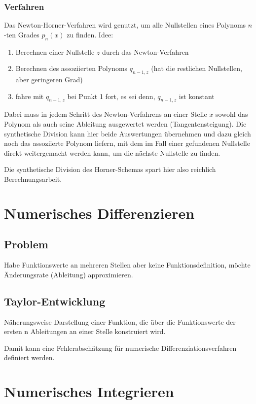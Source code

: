 \documentclass[a4paper, 12pt]{article}
\begin{document}
\subsubsection*{Verfahren}
Das Newton-Horner-Verfahren wird genutzt, um alle Nullstellen eines Polynoms \(n\)-ten Grades \(p_n(x)\) zu finden. Idee:
\begin{enumerate}
  \item Berechnen einer Nullstelle \(z\) durch das Newton-Verfahren
  \item Berechnen des assoziierten Polynoms \(q_{n-1,z}\) (hat die restlichen Nullstellen, aber geringeren Grad)
  \item fahre mit \(q_{n-1,z}\) bei Punkt 1 fort, es sei denn, \(q_{n-1,z}\) ist konstant
\end{enumerate}
Dabei muss in jedem Schritt des Newton-Verfahrens an einer Stelle \(x\) sowohl das Polynom als auch seine Ableitung ausgewertet werden (Tangentensteigung). Die synthetische Division kann hier beide Auswertungen übernehmen und dazu gleich noch das assoziierte Polynom liefern, mit dem im Fall einer gefundenen Nullstelle direkt weitergemacht werden kann, um die nächste Nullstelle zu finden.

Die synthetische Division des Horner-Schemas spart hier also reichlich Berechnungsarbeit.



\section{Numerisches Differenzieren}


\subsection{Problem}
Habe Funktionswerte an mehreren Stellen aber keine Funktionsdefinition, möchte Änderungsrate (Ableitung) approximieren.


\subsection{Taylor-Entwicklung}
Näherungsweise Darstellung einer Funktion, die über die Funktionswerte der ersten n Ableitungen an einer Stelle konstruiert wird.

Damit kann eine Fehlerabschätzung für numerische Differenziationsverfahren definiert werden.



\section{Numerisches Integrieren}
\end{document}
